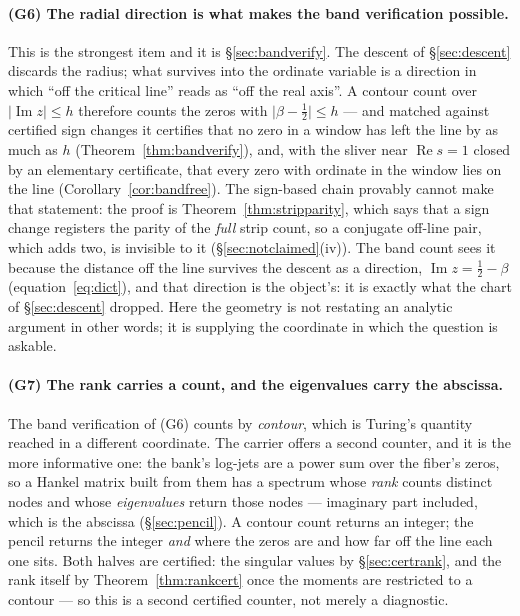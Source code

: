 \documentclass[11pt]{article}
\theoremstyle{plain}
\theoremstyle{definition}
\theoremstyle{remark}
\begin{document}
\paragraph{(G6) The radial direction is what makes the band verification possible.}
This is the strongest item and it is \S\ref{sec:bandverify}. The descent of
\S\ref{sec:descent} discards the radius; what survives into the ordinate variable is a
direction in which ``off the critical line'' reads as ``off the real axis''. A contour
count over $\lvert\operatorname{Im}z\rvert\le h$ therefore counts the zeros with
$\lvert\beta-\tfrac12\rvert\le h$ --- and matched against certified sign changes it
certifies that no zero in a window has left the line by as much as $h$
(Theorem~\ref{thm:bandverify}), and, with the sliver near $\operatorname{Re}s=1$ closed by
an elementary certificate, that every zero with ordinate in the window lies on the line
(Corollary~\ref{cor:bandfree}). The sign-based chain provably cannot make that statement:
the proof is Theorem~\ref{thm:stripparity}, which says that a sign change registers the
parity of the \emph{full} strip count, so a conjugate off-line pair, which adds two, is
invisible to it (\S\ref{sec:notclaimed}(iv)). The band count sees it because the distance
off the line survives the descent as a direction, $\operatorname{Im}z=\tfrac12-\beta$
(equation~\eqref{eq:dict}), and that direction is the object's: it is exactly what the chart
of \S\ref{sec:descent} dropped. Here the geometry is not restating an analytic argument in
other words; it is supplying the coordinate in which the question is askable.

\paragraph{(G7) The rank carries a count, and the eigenvalues carry the abscissa.}
The band verification of (G6) counts by \emph{contour}, which is Turing's quantity reached
in a different coordinate. The carrier offers a second counter, and it is the more
informative one: the bank's log-jets are a power sum over the fiber's zeros, so a Hankel
matrix built from them has a spectrum whose \emph{rank} counts distinct nodes and whose
\emph{eigenvalues} return those nodes --- imaginary part included, which is the abscissa
(\S\ref{sec:pencil}). A contour count returns an integer; the pencil returns the integer
\emph{and} where the zeros are and how far off the line each one sits. Both halves are
certified: the singular values by \S\ref{sec:certrank}, and the rank itself by
Theorem~\ref{thm:rankcert} once the moments are restricted to a contour --- so this is a
second certified counter, not merely a diagnostic.
\end{document}
